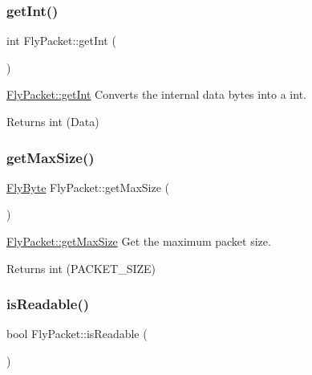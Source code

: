 \subsubsection{\texorpdfstring{get\+Int()}{getInt()}}
{\footnotesize\ttfamily int Fly\+Packet\+::get\+Int (\begin{DoxyParamCaption}{ }\end{DoxyParamCaption})}



\hyperlink{class_fly_packet_a0a24a69f5c318d9579fac40ad5c7b502}{Fly\+Packet\+::get\+Int} Converts the internal data bytes into a int. 

\begin{DoxyReturn}{Returns}
int (Data) 
\end{DoxyReturn}
\hypertarget{class_fly_packet_ad8406536002965db603f5c9f03906794}{}\label{class_fly_packet_ad8406536002965db603f5c9f03906794} 
\subsubsection{\texorpdfstring{get\+Max\+Size()}{getMaxSize()}}
{\footnotesize\ttfamily \hyperlink{conversions_8h_a1f006e31a957accfe6aa1bf6f401efce}{Fly\+Byte} Fly\+Packet\+::get\+Max\+Size (\begin{DoxyParamCaption}{ }\end{DoxyParamCaption})}



\hyperlink{class_fly_packet_ad8406536002965db603f5c9f03906794}{Fly\+Packet\+::get\+Max\+Size} Get the maximum packet size. 

\begin{DoxyReturn}{Returns}
int (P\+A\+C\+K\+E\+T\+\_\+\+S\+I\+ZE) 
\end{DoxyReturn}
\hypertarget{class_fly_packet_a9c1a141b4b44004015618da46829200d}{}\label{class_fly_packet_a9c1a141b4b44004015618da46829200d} 
\subsubsection{\texorpdfstring{is\+Readable()}{isReadable()}}
{\footnotesize\ttfamily bool Fly\+Packet\+::is\+Readable (\begin{DoxyParamCaption}{ }\end{DoxyParamCaption})}




